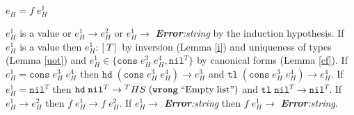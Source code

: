 \begin{case}
$e_{H}=f\;e_{H}^{1}$

$e_{H}^{1}$ is a value or $e_{H}^{1}\rightarrow e_{H}^{2}$ or $e_{H}^{1}\rightarrow$ \emph{\textbf{Error}:\;string} by the induction hypothesis.  If $e_{H}^{1}$ is a value then $e_{H}^{1}:[T]$ by inversion (Lemma \ref{i}) and uniqueness of types (Lemma \ref{uot}) and $e_{H}^{1}\in\lbrace\mathtt{cons}\;e_{H}^{3}\;e_{H}^{4},\mathtt{nil}^{T}\rbrace$ by canonical forms (Lemma \ref{cf}).  If $e_{H}^{1}=\mathtt{cons}\;e_{H}^{3}\;e_{H}^{4}$ then $\mathtt{hd}\;(\mathtt{cons}\;e_{H}^{3}\;e_{H}^{4})\rightarrow e_{H}^{3}$ and $\mathtt{tl}\;(\mathtt{cons}\;e_{H}^{3}\;e_{H}^{4})\rightarrow e_{H}^{4}$.  If $e_{H}^{1}=\mathtt{nil}^{T}$ then $\mathtt{hd}\;\mathtt{nil}^{T}\rightarrow{^{T}H}S\;(\mathtt{wrong}\;\mathrm{``Empty\;list"})$ and $\mathtt{tl}\;\mathtt{nil}^{T}\rightarrow\mathtt{nil}^{T}$.  If $e_{H}^{1}\rightarrow e_{H}^{2}$ then $f\;e_{H}^{1}\rightarrow f\;e_{H}^{2}$.  If $e_{H}^{1}\rightarrow$ \emph{\textbf{Error}:\;string} then $f\;e_{H}^{1}\rightarrow$ \emph{\textbf{Error}:\;string}.
\end{case}